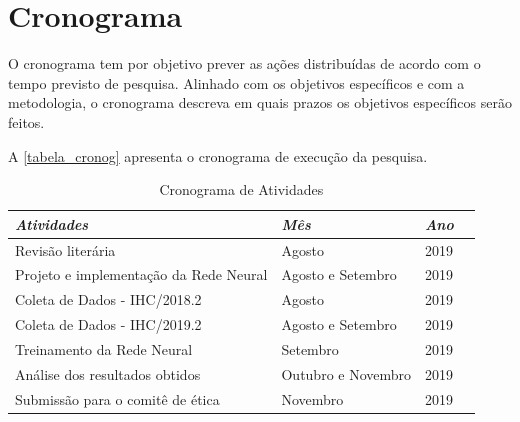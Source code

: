 \documentclass[
	12pt,				%
	openright,			%
	oneside,
	a4paper,			%
	english,			%
	french,				%
	spanish,			%
	brazil,				%
	]{abntex2}
\begin{document}


\chapter{Cronograma}

    O cronograma tem por objetivo prever as ações distribuídas de acordo com o tempo previsto de pesquisa. Alinhado com os objetivos específicos e com a metodologia, o cronograma descreva em quais prazos os objetivos específicos serão feitos.

A \autoref{tabela_cronog} apresenta o cronograma de execução da pesquisa. 

\begin{table}[!htb]
\centering
\caption{Cronograma de Atividades}
\label{tabela_cronog}
\begin{tabular}{@{}llll@{}}
\toprule
\textit{Atividades}                    & \textit{Mês}       & \textit{Ano}   \\ \midrule
Revisão literária                      & Agosto             & 2019      \\
Projeto e implementação da Rede Neural & Agosto e Setembro  & 2019      \\
Coleta de Dados - IHC/2018.2           & Agosto             & 2019      \\
Coleta de Dados - IHC/2019.2           & Agosto e Setembro  & 2019      \\
Treinamento da Rede Neural             & Setembro           & 2019      \\
Análise dos resultados obtidos         & Outubro e Novembro & 2019      \\
Submissão para o comitê de ética       & Novembro           & 2019      \\
                                \bottomrule
\end{tabular}
\end{table}







\end{document}
